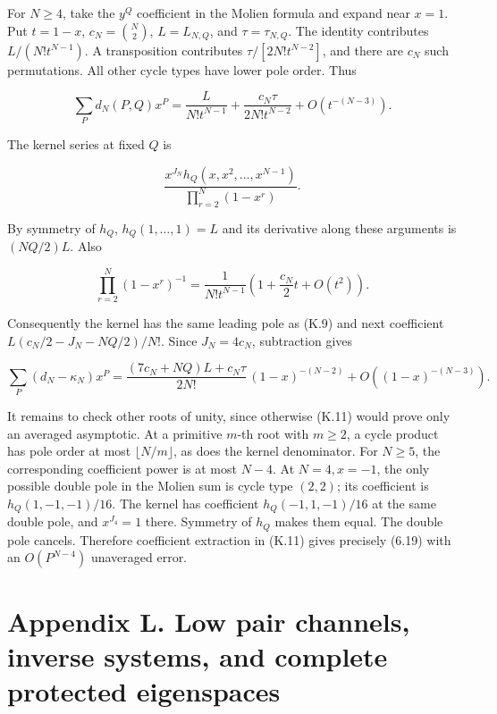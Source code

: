 For \(N\ge4\), take the \(y^Q\) coefficient in the Molien formula and expand near \(x=1\). Put \(t=1-x\), \(c_N=\binom N2\), \(L=L_{N,Q}\), and \(\tau=\tau_{N,Q}\). The identity contributes \(L/(N!t^{N-1})\). A transposition contributes \(\tau/[2N!t^{N-2}]\), and there are \(c_N\) such permutations. All other cycle types have lower pole order. Thus

\[
\sum_Pd_N(P,Q)x^P
=\frac{L}{N!t^{N-1}}+\frac{c_N\tau}{2N!t^{N-2}}+O(t^{-(N-3)}).
\tag{K.9}
\]

The kernel series at fixed \(Q\) is

\[
\frac{x^{J_N}h_Q(x,x^2,\ldots,x^{N-1})}{\prod_{r=2}^N(1-x^r)}.
\tag{K.10}
\]

By symmetry of \(h_Q\), \(h_Q(1,\ldots,1)=L\) and its derivative along these arguments is \((NQ/2)L\). Also

\[
\prod_{r=2}^N(1-x^r)^{-1}
=\frac1{N!t^{N-1}}\left(1+\frac{c_N}{2}t+O(t^2)\right).
\]

Consequently the kernel has the same leading pole as (K.9) and next coefficient \(L(c_N/2-J_N-NQ/2)/N!\). Since \(J_N=4c_N\), subtraction gives

\[
\sum_P(d_N-\kappa_N)x^P
=\frac{(7c_N+NQ)L+c_N\tau}{2N!}\,(1-x)^{-(N-2)}
+O((1-x)^{-(N-3)}).
\tag{K.11}
\]

It remains to check other roots of unity, since otherwise (K.11) would prove only an averaged asymptotic. At a primitive \(m\)-th root with \(m\ge2\), a cycle product has pole order at most \(\lfloor N/m\rfloor\), as does the kernel denominator. For \(N\ge5\), the corresponding coefficient power is at most \(N-4\). At \(N=4,x=-1\), the only possible double pole in the Molien sum is cycle type \((2,2)\); its coefficient is \(h_Q(1,-1,-1)/16\). The kernel has coefficient \(h_Q(-1,1,-1)/16\) at the same double pole, and \(x^{J_4}=1\) there. Symmetry of \(h_Q\) makes them equal. The double pole cancels. Therefore coefficient extraction in (K.11) gives precisely (6.19) with an \(O(P^{N-4})\) unaveraged error.

\clearpage
\hypertarget{appendix-l.-low-pair-channels-inverse-systems-and-complete-protected-eigenspaces}{%
\section{Appendix L. Low pair channels, inverse systems, and complete protected eigenspaces}\label{appendix-l.-low-pair-channels-inverse-systems-and-complete-protected-eigenspaces}}

